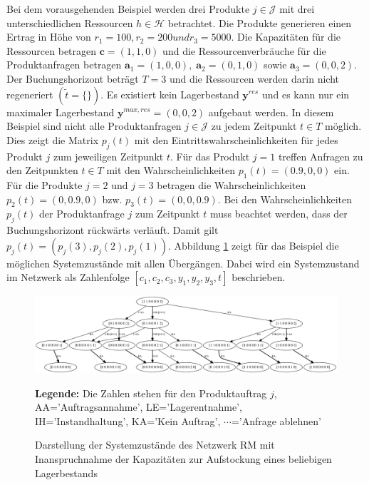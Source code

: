 Bei dem vorausgehenden Beispiel werden drei Produkte $j\in\mathcal{J}$ mit drei unterschiedlichen Ressourcen $h\in\mathcal{H}$ betrachtet. Die Produkte generieren einen Ertrag in Höhe von $r_1=100, r_2=200 und r_3=5000$. Die Kapazitäten für die Ressourcen betragen $\textbf{c}=(1,1,0)$ und die Ressourcenverbräuche für die Produktanfragen betragen $\textbf{a}_1=(1,0,0),\; \textbf{a}_2=(0,1,0)$ sowie $\textbf{a}_3=(0,0,2)$. Der Buchungshorizont beträgt $T=3$ und die Ressourcen werden darin nicht regeneriert $(\tilde{t}=\{\})$. Es existiert kein Lagerbestand $\textbf{y}^{res}$ und es kann nur ein maximaler Lagerbestand $\textbf{y}^{max,res}=(0, 0, 2)$ aufgebaut werden. In diesem Beispiel sind nicht alle Produktanfragen $j\in\mathcal{J}$ zu jedem Zeitpunkt $t\in T$ möglich. Dies zeigt die Matrix $p_{j}(t)$ mit den Eintrittswahrscheinlichkeiten für jedes Produkt $j$ zum jeweiligen Zeitpunkt $t$. Für das Produkt $j=1$ treffen Anfragen zu den Zeitpunkten $t\in T$ mit den Wahrscheinlichkeiten $p_{1}(t)=(0.9, 0, 0)$ ein. Für die Produkte $j=2$ und $j=3$ betragen die Wahrscheinlichkeiten $p_{2}(t)=(0, 0.9, 0)$ bzw. $p_{3}(t)=(0, 0, 0.9)$. Bei den Wahrscheinlichkeiten $p_j(t)$ der Produktanfrage $j$ zum Zeitpunkt $t$ muss beachtet werden, dass der Buchungshorizont rückwärts verläuft. Damit gilt $p_{j}(t)=(p_{j}(3), p_{j}(2), p_{j}(1))$. Abbildung \ref{B7} zeigt für das Beispiel die möglichen Systemzustände mit allen Übergängen. Dabei wird ein Systemzustand im Netzwerk als Zahlenfolge $[c_1,c_2,c_3,y_1,y_2,y_3,t]$ beschrieben.
 
\begin{figure}[h!]
  \begin{center}
    \includegraphics[width=200mm, angle=90]{Bilder/Beispiel7.pdf}
    \caption{Darstellung der Systemzustände des Netzwerk RM mit Inanspruchnahme der Kapazitäten zur Aufstockung eines beliebigen Lagerbestands}  \label{B7}
    {\footnotesize \textbf{Legende:} Die Zahlen stehen für den Produktauftrag $j$, AA='Auftragsannahme', LE='Lagerentnahme', IH='Instandhaltung', KA='Kein Auftrag', $\cdots$='Anfrage ablehnen'} 
  \end{center}
\end{figure}

